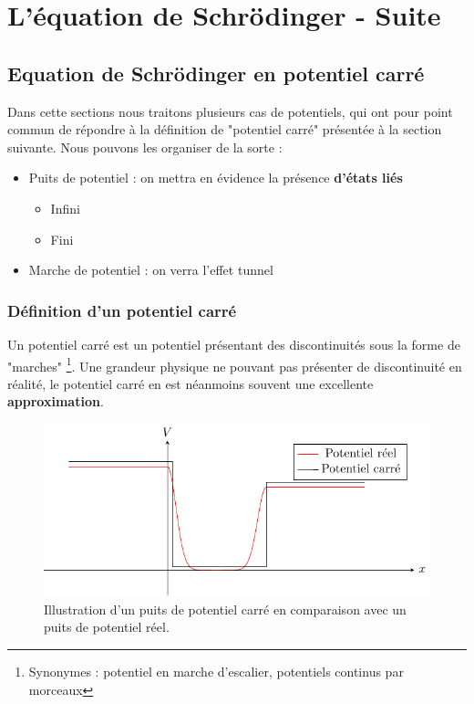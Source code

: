 \documentclass{book}
\begin{document}
\chapter{L'équation de Schrödinger - Suite}\label{chap:chap3}



\section{Equation de Schrödinger en potentiel carré}
Dans cette sections nous traitons plusieurs cas de potentiels, qui ont pour point commun de répondre à la définition de "potentiel carré" présentée à la section suivante. Nous pouvons les organiser de la sorte :
\begin{itemize}
  \item Puits de potentiel : on mettra en évidence la présence \textbf{d'états liés}
    \begin{itemize}%
      \item Infini
      \item Fini
    \end{itemize}
  \item Marche de potentiel : on verra l'effet tunnel
\end{itemize}
\subsection{Définition d'un potentiel carré} \label{ch2-subsection-Definition_pot_carre}
Un potentiel carré est un potentiel présentant des discontinuités sous la forme de "marches" \footnote{Synonymes : potentiel en marche d'escalier, potentiels continus par morceaux}. Une grandeur physique ne pouvant pas présenter de discontinuité en réalité, le potentiel carré en est néanmoins souvent une excellente \textbf{approximation}.




\begin{figure}[h]
\centering
\includegraphics{images/pot_carre.pdf}
\caption{Illustration d'un puits de potentiel carré en comparaison avec un puits de potentiel réel.}
\label{fig:potentiel_carre}
\end{figure}
\end{document}
